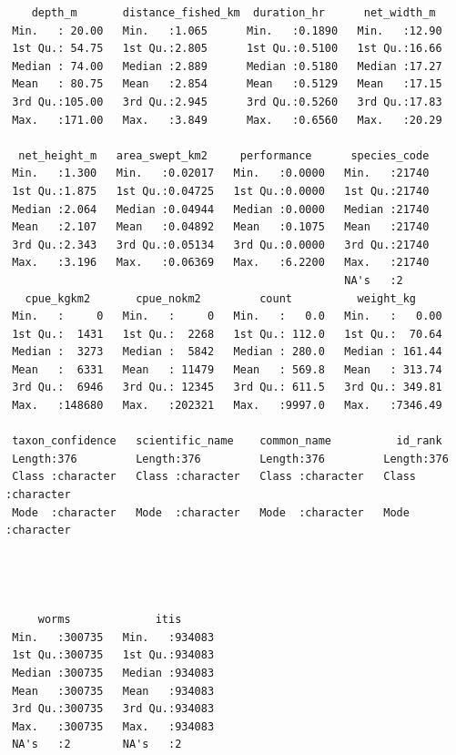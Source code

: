 \documentclass[
  letterpaper,
  oneside,
  open=any]{scrbook}
\begin{document}
\begin{verbatim}
    depth_m       distance_fished_km  duration_hr      net_width_m   
 Min.   : 20.00   Min.   :1.065      Min.   :0.1890   Min.   :12.90  
 1st Qu.: 54.75   1st Qu.:2.805      1st Qu.:0.5100   1st Qu.:16.66  
 Median : 74.00   Median :2.889      Median :0.5180   Median :17.27  
 Mean   : 80.75   Mean   :2.854      Mean   :0.5129   Mean   :17.15  
 3rd Qu.:105.00   3rd Qu.:2.945      3rd Qu.:0.5260   3rd Qu.:17.83  
 Max.   :171.00   Max.   :3.849      Max.   :0.6560   Max.   :20.29  
                                                                     
  net_height_m   area_swept_km2     performance      species_code  
 Min.   :1.300   Min.   :0.02017   Min.   :0.0000   Min.   :21740  
 1st Qu.:1.875   1st Qu.:0.04725   1st Qu.:0.0000   1st Qu.:21740  
 Median :2.064   Median :0.04944   Median :0.0000   Median :21740  
 Mean   :2.107   Mean   :0.04892   Mean   :0.1075   Mean   :21740  
 3rd Qu.:2.343   3rd Qu.:0.05134   3rd Qu.:0.0000   3rd Qu.:21740  
 Max.   :3.196   Max.   :0.06369   Max.   :6.2200   Max.   :21740  
                                                    NA's   :2      
   cpue_kgkm2       cpue_nokm2         count          weight_kg      
 Min.   :     0   Min.   :     0   Min.   :   0.0   Min.   :   0.00  
 1st Qu.:  1431   1st Qu.:  2268   1st Qu.: 112.0   1st Qu.:  70.64  
 Median :  3273   Median :  5842   Median : 280.0   Median : 161.44  
 Mean   :  6331   Mean   : 11479   Mean   : 569.8   Mean   : 313.74  
 3rd Qu.:  6946   3rd Qu.: 12345   3rd Qu.: 611.5   3rd Qu.: 349.81  
 Max.   :148680   Max.   :202321   Max.   :9997.0   Max.   :7346.49  
                                                                     
 taxon_confidence   scientific_name    common_name          id_rank         
 Length:376         Length:376         Length:376         Length:376        
 Class :character   Class :character   Class :character   Class :character  
 Mode  :character   Mode  :character   Mode  :character   Mode  :character  
                                                                            
                                                                            
                                                                            
                                                                            
     worms             itis       
 Min.   :300735   Min.   :934083  
 1st Qu.:300735   1st Qu.:934083  
 Median :300735   Median :934083  
 Mean   :300735   Mean   :934083  
 3rd Qu.:300735   3rd Qu.:934083  
 Max.   :300735   Max.   :934083  
 NA's   :2        NA's   :2       
\end{verbatim}
\end{document}

